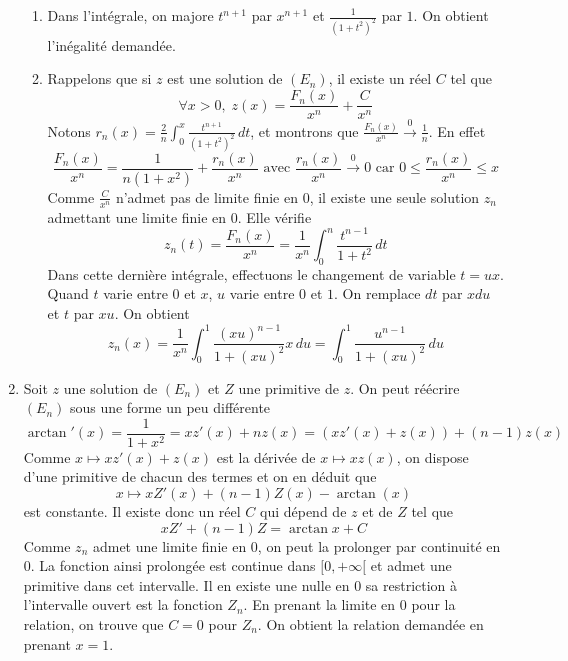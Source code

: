 \begin{enumerate}
\begin{enumerate}
  \item Dans l'intégrale, on majore $t^{n+1}$ par $x^{n+1}$ et $\frac{1}{(1+t^2)^2}$ par $1$. On obtient l'inégalité demandée.

  \item Rappelons que si $z$ est une solution de $(E_n)$, il existe un réel $C$ tel que 
\begin{displaymath}
\forall x>0,\; z(x) = \frac{F_n(x)}{x^n} + \frac{C}{x^n}  
\end{displaymath}
Notons $r_n(x) = \frac{2}{n}\int_0^x\frac{t^{n+1}}{(1+t^2)^2}\,dt$, et montrons que $\frac{F_n(x)}{x^n} \xrightarrow{0} \frac{1}{n}$. En effet
\begin{displaymath}
  \frac{F_n(x)}{x^n} = \frac{1}{n(1+x^2)} + \frac{r_n(x)}{x^n} \text{ avec } \frac{r_n(x)}{x^n}\xrightarrow{0}0
   \text{ car } 0\leq \frac{r_n(x)}{x^n} \leq x
\end{displaymath}
Comme $\frac{C}{x^n}$ n'admet pas de limite finie en $0$, il existe une seule solution $z_n$ admettant une limite finie en $0$. Elle vérifie 
\begin{displaymath}
  z_n(t) = \frac{F_n(x)}{x^n} = \frac{1}{x^n}\int_0^n\frac{t^{n-1}}{1+t^2}\,dt
\end{displaymath}
Dans cette dernière intégrale, effectuons le changement de variable $t=ux$. Quand $t$ varie entre $0$ et $x$, $u$ varie entre $0$ et $1$. On remplace $dt$ par $xdu$ et $t$ par $xu$. On obtient
\begin{displaymath}
z_n(x) = \frac{1}{x^n}\int_0^1\frac{(xu)^{n-1}}{1+(xu)^2}x\,du
= \int_0^1\frac{u^{n-1}}{1+(xu)^2}\,du
\end{displaymath}
\end{enumerate}

  \item Soit $z$ une solution de $(E_n)$ et $Z$ une primitive de $z$. On peut réécrire $(E_n)$ sous une forme un peu différente
\begin{displaymath}
\arctan'(x) = \frac{1}{1+x^2} = xz'(x) + nz(x) = \left( xz'(x) +z(x)\right) + (n-1)z(x)   
\end{displaymath}
Comme $x \mapsto xz'(x) +z(x)$ est la dérivée de $x\mapsto xz(x)$, on dispose d'une primitive de chacun des termes et on en déduit que 
\begin{displaymath}
  x\mapsto xZ'(x) + (n-1)Z(x) - \arctan(x)
\end{displaymath}
est constante. Il existe donc un réel $C$ qui dépend de $z$ et de $Z$ tel que 
\begin{displaymath}
 xZ' + (n-1)Z = \arctan x + C 
\end{displaymath}
Comme $z_n$ admet une limite finie en $0$, on peut la prolonger par continuité en $0$. La fonction ainsi prolongée est continue dans $[0,+\infty[$ et admet une primitive dans cet intervalle. Il en existe une nulle en $0$ sa restriction à l'intervalle ouvert est la fonction $Z_n$. En prenant la limite en $0$ pour la relation, on trouve que $C=0$ pour $Z_n$. On obtient la relation demandée en prenant $x=1$.
\end{enumerate}

